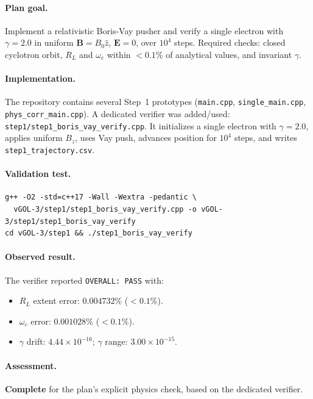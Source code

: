 \documentclass[11pt,a4paper]{article}
\begin{document}
\paragraph{Plan goal.}
Implement a relativistic Boris-Vay pusher and verify a single electron with $\gamma=2.0$ in uniform $\mathbf{B}=B_0\hat z$, $\mathbf{E}=0$, over $10^4$ steps. Required checks: closed cyclotron orbit, $R_L$ and $\omega_c$ within $<0.1\%$ of analytical values, and invariant $\gamma$.

\paragraph{Implementation.}
The repository contains several Step~1 prototypes (\texttt{main.cpp}, \texttt{single\_main.cpp}, \texttt{phys\_corr\_main.cpp}). A dedicated verifier was added/used: \texttt{step1/step1\_boris\_vay\_verify.cpp}. It initializes a single electron with $\gamma=2.0$, applies uniform $B_z$, uses Vay push, advances position for $10^4$ steps, and writes \texttt{step1\_trajectory.csv}.

\paragraph{Validation test.}
\begin{lstlisting}
g++ -O2 -std=c++17 -Wall -Wextra -pedantic \
  vGOL-3/step1/step1_boris_vay_verify.cpp -o vGOL-3/step1/step1_boris_vay_verify
cd vGOL-3/step1 && ./step1_boris_vay_verify
\end{lstlisting}

\paragraph{Observed result.}
The verifier reported \texttt{OVERALL: PASS} with:
\begin{itemize}[leftmargin=*]
  \item $R_L$ extent error: $0.004732\%$ ($<0.1\%$).
  \item $\omega_c$ error: $0.001028\%$ ($<0.1\%$).
  \item $\gamma$ drift: $4.44\times10^{-16}$; $\gamma$ range: $3.00\times10^{-15}$.
\end{itemize}

\paragraph{Assessment.}
\textbf{Complete} for the plan's explicit physics check, based on the dedicated verifier.
\end{document}
